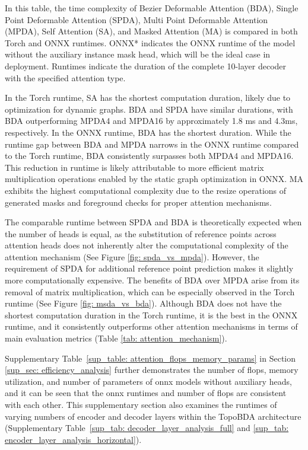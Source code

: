 In this table, the time complexity of Bezier Deformable Attention (BDA), Single Point Deformable Attention (SPDA), Multi Point Deformable Attention (MPDA), Self Attention (SA), and Masked Attention (MA) is compared in both Torch and ONNX runtimes. ONNX* indicates the ONNX runtime of the model without the auxiliary instance mask head, which will be the ideal case in deployment. Runtimes indicate the duration of the complete 10-layer decoder with the specified attention type. 

In the Torch runtime, SA has the shortest computation duration, likely due to optimization for dynamic graphs. BDA and SPDA have similar durations, with BDA outperforming MPDA4 and MPDA16 by approximately 1.8 ms and 4.3ms, respectively. In the ONNX runtime, BDA has the shortest duration. While the runtime gap between BDA and MPDA narrows in the ONNX runtime compared to the Torch runtime, BDA consistently surpasses both MPDA4 and MPDA16. This reduction in runtime is likely attributable to more efficient matrix multiplication operations enabled by the static graph optimization in ONNX. MA exhibits the highest computational complexity due to the resize operations of generated masks and foreground checks for proper attention mechanisms. 

The comparable runtime between SPDA and BDA is theoretically expected when the number of heads is equal, as the substitution of reference points across attention heads does not inherently alter the computational complexity of the attention mechanism (See Figure \ref{fig: spda_vs_mpda}). However, the requirement of SPDA for additional reference point prediction makes it slightly more computationally expensive. The benefits of BDA over MPDA arise from its removal of matrix multiplication, which can be especially observed in the Torch runtime (See Figure \ref{fig: msda_vs_bda}). Although BDA does not have the shortest computation duration in the Torch runtime, it is the best in the ONNX runtime, and it consistently outperforms other attention mechanisms in terms of main evaluation metrics (Table \ref{tab: attention_mechanism}). 

Supplementary Table~\ref{sup_table: attention_flops_memory_params} in Section \ref{sup_sec: efficiency_analysis} further demonstrates the number of flops, memory utilization, and number of parameters of onnx models without auxiliary heads, and it can be seen that the onnx runtimes and number of flops are consistent with each other. This supplementary section also examines the runtimes of varying numbers of encoder and decoder layers within the TopoBDA architecture (Supplementary Table~\ref{sup_tab: decoder_layer_analysis_full} and \ref{sup_tab: encoder_layer_analysis_horizontal}). 


